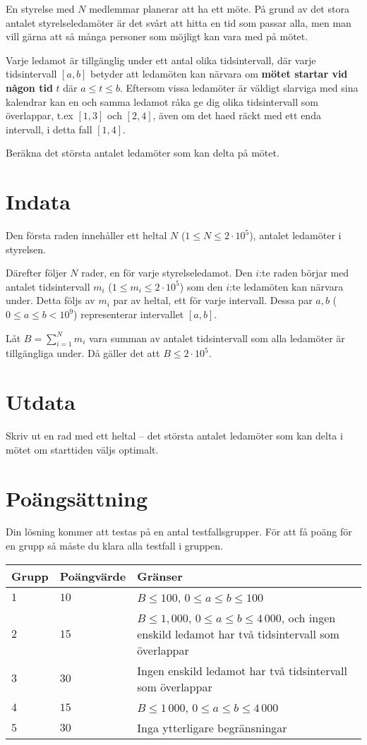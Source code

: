En styrelse med $N$ medlemmar planerar att ha ett möte.
På grund av det stora antalet styrelseledamöter är det svårt att hitta en tid som passar alla, men man vill gärna att så många personer som möjligt kan vara med på mötet.

Varje ledamot är tillgänglig under ett antal olika tidsintervall, där varje tidsintervall $[a, b]$ betyder att ledamöten kan närvara om \textbf{mötet startar vid någon tid} $t$ där $a \le t \le b$.
Eftersom vissa ledamöter är väldigt slarviga med sina kalendrar kan en och samma ledamot råka ge dig olika tidsintervall som överlappar, t.ex $[1, 3]$ och $[2, 4]$, även om det haed räckt med ett enda intervall, i detta fall $[1, 4]$.

Beräkna det största antalet ledamöter som kan delta på mötet.

\section*{Indata}
Den första raden innehåller ett heltal $N$ ($1 \le N \leq 2\cdot 10^5$), antalet ledamöter i styrelsen.

Därefter följer $N$ rader, en för varje styrelseledamot.
Den $i$:te raden börjar med antalet tidsintervall $m_i$ ($1 \leq m_i \leq 2\cdot 10^5$) som den $i$:te ledamöten kan närvara under.
Detta följs av $m_i$ par av heltal, ett för varje intervall.
Dessa par $a, b$ ($0 \le a \le b < 10^9$) representerar intervallet $[a, b]$.

Låt $B=\sum_{i=1}^{N} m_i$ vara summan av antalet tidsintervall som alla ledamöter är tillgängliga under.
Då gäller det att $B \leq 2\cdot 10^5$.

\section*{Utdata}
Skriv ut en rad med ett heltal -- det största antalet ledamöter som kan delta i mötet om starttiden väljs optimalt.

\section*{Poängsättning}
Din lösning kommer att testas på en antal testfallsgrupper.
För att få poäng för en grupp så måste du klara alla testfall i gruppen.

\noindent
\begin{tabular}{| l | l | p{12cm} |}
  \hline
  Grupp & Poängvärde & Gränser \\ \hline
  $1$   & $10$       & $B \leq 100$, $0 \leq a \leq b \leq 100$ \\ \hline
  $2$   & $15$       & $B \leq  1,000$, $0 \leq a \leq b \leq 4\,000$, och ingen enskild ledamot har två tidsintervall som överlappar \\ \hline
  $3$   & $30$       & Ingen enskild ledamot har två tidsintervall som överlappar \\ \hline
  $4$   & $15$       & $B \leq 1\,000$, $0 \leq a \leq b \leq 4\,000$ \\ \hline
  $5$   & $30$       & Inga ytterligare begränsningar \\ \hline
\end{tabular}

